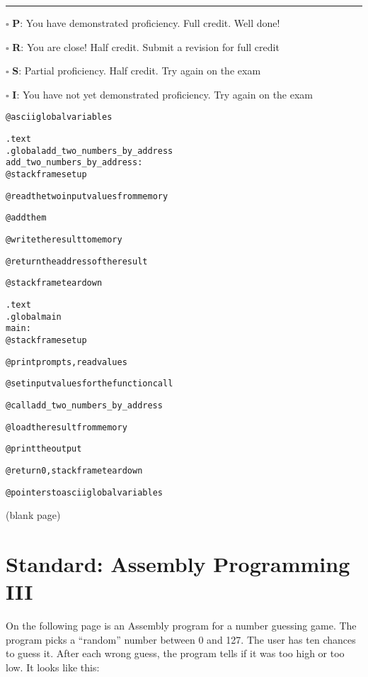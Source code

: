 \documentclass[12pt]{article}
\begin{document}
\vfill

\rule[1ex]{\textwidth}{.1pt}

$\square$ \textbf{P}: You have demonstrated proficiency. Full credit. Well done!

$\square$ \textbf{R}: You are close! Half credit. Submit a revision for full credit

$\square$ \textbf{S}: Partial proficiency. Half credit. Try again on the exam

$\square$ \textbf{I}: You have not yet demonstrated proficiency. Try again on the exam

\newpage

\begin{alltt}
@ ascii global variables

    .text
    .global add_two_numbers_by_address
add_two_numbers_by_address:
    @ stack frame setup

    @ read the two input values from memory

    @ add them
    
    @ write the result to memory

    @ return the address of the result

    @ stack frame teardown

    .text
    .global main
main: 
    @ stack frame setup

    @ print prompts, read values

    @ set input values for the function call

    @ call add_two_numbers_by_address

    @ load the result from memory

    @ print the output

    @ return 0, stack frame teardown

@ pointers to ascii global variables
\end{alltt}

\newpage

\begin{center}
(blank page)
\end{center}

\newpage

\section*{Standard: Assembly Programming III}

On the following page is an Assembly program for a number guessing game. The program picks a ``random'' number between 0 and 127. The user has ten chances to guess it. After each wrong guess, the program tells if it was too high or too low. It looks like this:
\end{document}
